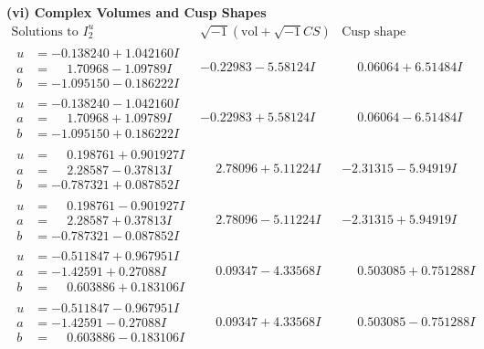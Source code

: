 \documentclass[1p]{elsarticle_modified}
\theoremstyle{definition}
\newcommand{\I}{\sqrt{-1}}
\begin{document}
\newpage\flushleft \textbf{(vi) Complex Volumes and Cusp Shapes}
$$\begin{array}{c|c|c}  
\text{Solutions to }I^u_{2}& \I (\text{vol} + \sqrt{-1}CS) & \text{Cusp shape}\\
 \hline 
\begin{aligned}
u &= -0.138240 + 1.042160 I \\
a &= \phantom{-}1.70968 - 1.09789 I \\
b &= -1.095150 - 0.186222 I\end{aligned}
 & -0.22983 - 5.58124 I & \phantom{-}0.06064 + 6.51484 I \\ \hline\begin{aligned}
u &= -0.138240 - 1.042160 I \\
a &= \phantom{-}1.70968 + 1.09789 I \\
b &= -1.095150 + 0.186222 I\end{aligned}
 & -0.22983 + 5.58124 I & \phantom{-}0.06064 - 6.51484 I \\ \hline\begin{aligned}
u &= \phantom{-}0.198761 + 0.901927 I \\
a &= \phantom{-}2.28587 - 0.37813 I \\
b &= -0.787321 + 0.087852 I\end{aligned}
 & \phantom{-}2.78096 + 5.11224 I & -2.31315 - 5.94919 I \\ \hline\begin{aligned}
u &= \phantom{-}0.198761 - 0.901927 I \\
a &= \phantom{-}2.28587 + 0.37813 I \\
b &= -0.787321 - 0.087852 I\end{aligned}
 & \phantom{-}2.78096 - 5.11224 I & -2.31315 + 5.94919 I \\ \hline\begin{aligned}
u &= -0.511847 + 0.967951 I \\
a &= -1.42591 + 0.27088 I \\
b &= \phantom{-}0.603886 + 0.183106 I\end{aligned}
 & \phantom{-}0.09347 - 4.33568 I & \phantom{-}0.503085 + 0.751288 I \\ \hline\begin{aligned}
u &= -0.511847 - 0.967951 I \\
a &= -1.42591 - 0.27088 I \\
b &= \phantom{-}0.603886 - 0.183106 I\end{aligned}
 & \phantom{-}0.09347 + 4.33568 I & \phantom{-}0.503085 - 0.751288 I \\ \hline\begin{aligned}

\end{aligned}
\end{array}$$
\end{document}
